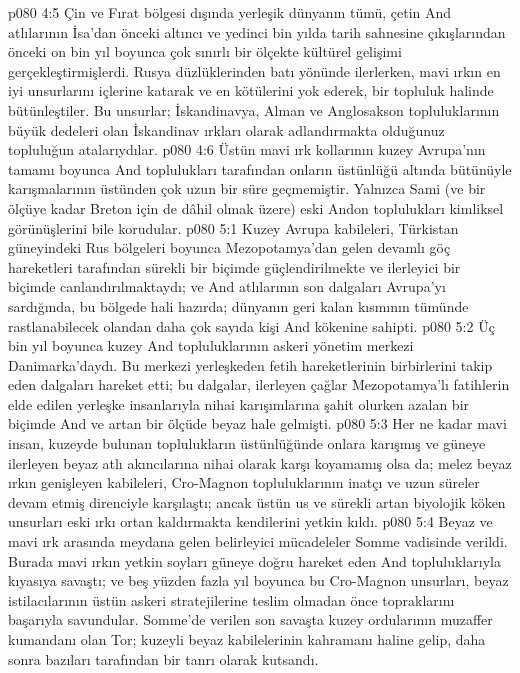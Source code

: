 \vs p080 4:5 Çin ve Fırat bölgesi dışında yerleşik dünyanın tümü, çetin And atlılarının İsa’dan önceki altıncı ve yedinci bin yılda tarih sahnesine çıkışlarından önceki on bin yıl boyunca çok sınırlı bir ölçekte kültürel gelişimi gerçekleştirmişlerdi. Rusya düzlüklerinden batı yönünde ilerlerken, mavi ırkın en iyi unsurlarını içlerine katarak ve en kötülerini yok ederek, bir topluluk halinde bütünleştiler. Bu unsurlar; İskandinavya, Alman ve Anglosakson topluluklarının büyük dedeleri olan İskandinav ırkları olarak adlandırmakta olduğunuz topluluğun atalarıydılar.
\vs p080 4:6 Üstün mavi ırk kollarının kuzey Avrupa’nın tamamı boyunca And toplulukları tarafından onların üstünlüğü altında bütünüyle karışmalarının üstünden çok uzun bir süre geçmemiştir. Yalnızca Sami (ve bir ölçüye kadar Breton için de dâhil olmak üzere) eski Andon toplulukları kimliksel görünüşlerini bile korudular.
\vs p080 5:1 Kuzey Avrupa kabileleri, Türkistan güneyindeki Rus bölgeleri boyunca Mezopotamya’dan gelen devamlı göç hareketleri tarafından sürekli bir biçimde güçlendirilmekte ve ilerleyici bir biçimde canlandırılmaktaydı; ve And atlılarının son dalgaları Avrupa’yı sardığında, bu bölgede hali hazırda; dünyanın geri kalan kısmının tümünde rastlanabilecek olandan daha çok sayıda kişi And kökenine sahipti.
\vs p080 5:2 Üç bin yıl boyunca kuzey And topluluklarının askeri yönetim merkezi Danimarka’daydı. Bu merkezi yerleşkeden fetih hareketlerinin birbirlerini takip eden dalgaları hareket etti; bu dalgalar, ilerleyen çağlar Mezopotamya’lı fatihlerin elde edilen yerleşke insanlarıyla nihai karışımlarına şahit olurken azalan bir biçimde And ve artan bir ölçüde beyaz hale gelmişti.
\vs p080 5:3 Her ne kadar mavi insan, kuzeyde bulunan toplulukların üstünlüğünde onlara karışmış ve güneye ilerleyen beyaz atlı akıncılarına nihai olarak karşı koyamamış olsa da; melez beyaz ırkın genişleyen kabileleri, Cro\hyp{}Magnon topluluklarının inatçı ve uzun süreler devam etmiş direnciyle karşılaştı; ancak üstün us ve sürekli artan biyolojik köken unsurları eski ırkı ortan kaldırmakta kendilerini yetkin kıldı.
\vs p080 5:4 Beyaz ve mavi ırk arasında meydana gelen belirleyici mücadeleler Somme vadisinde verildi. Burada mavi ırkın yetkin soyları güneye doğru hareket eden And topluluklarıyla kıyasıya savaştı; ve beş yüzden fazla yıl boyunca bu Cro\hyp{}Magnon unsurları, beyaz istilacılarının üstün askeri stratejilerine teslim olmadan önce topraklarını başarıyla savundular. Somme’de verilen son savaşta kuzey ordularının muzaffer kumandanı olan Tor; kuzeyli beyaz kabilelerinin kahramanı haline gelip, daha sonra bazıları tarafından bir tanrı olarak kutsandı.
